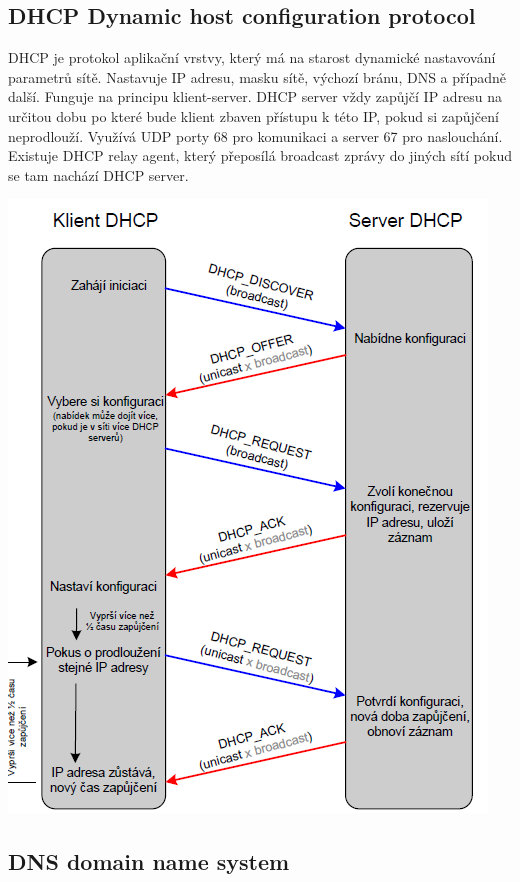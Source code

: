 \subsection{DHCP Dynamic host configuration protocol}

DHCP je protokol aplikační vrstvy, který má na starost dynamické nastavování parametrů sítě. Nastavuje IP adresu, masku sítě, výchozí bránu, DNS a případně další. Funguje na principu klient-server. DHCP server vždy zapůjčí IP adresu na určitou dobu po které bude klient zbaven přístupu k této IP, pokud si zapůjčení neprodlouží. Využívá UDP porty 68 pro komunikaci a server 67 pro naslouchání. Existuje DHCP relay agent, který přeposílá broadcast zprávy do jiných sítí pokud se tam nachází DHCP server.

\begin{center}
\includegraphics[scale = 0.8]{images/dhcp.png}
\end{center}

\subsection{DNS domain name system}


